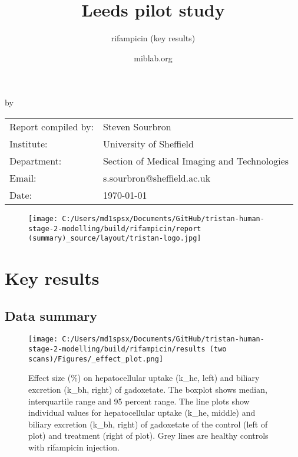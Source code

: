 \documentclass{epflreport}%
\begin{document}
%
\normalsize%
\frontmatter%
\title{Leeds pilot study}%
\subtitle{rifampicin (key results)}%
\author{miblab.org}%
\subject{D2.13 {-} Internal report}%
%
%
%
\makecover%
\begin{titlepage}%
\begin{center}%
\makeatletter%
\largetitlestyle\fontsize{45}{45}\selectfont\@title%
\makeatother%
\linebreak%
\makeatletter%
\ifdefvoid{\@subtitle}{}{\bigskip\titlestyle\fontsize{20}{20}\selectfont\@subtitle}%
\makeatother%
\linebreak%
\bigskip%
\bigskip%
by%
\linebreak%
\bigskip%
\bigskip%
\makeatletter%
\largetitlestyle\fontsize{25}{25}\selectfont\@author%
\makeatother%
\vfill%
\large%
\begin{tabular}{ll}%
\hline%
Report compiled by: &Steven Sourbron\\%
Institute: &University of Sheffield\\%
Department: &Section of Medical Imaging and Technologies\\%
Email: &s.sourbron@sheffield.ac.uk\\%
Date: &\today\\%
\hline%
\end{tabular}%


\begin{figure}[b!]%
\centering%
\centering%
\texttt{[image: C:/Users/md1spsx/Documents/GitHub/tristan-human-stage-2-modelling/build/rifampicin/report (summary)\_source/layout/tristan-logo.jpg]}%
\end{figure}

%
\end{center}%
\end{titlepage}%
\newpage%
\tableofcontents%
\mainmatter%
\clearpage%
\chapter{Key results}%
\section{Data summary}%
\label{sec:Datasummary}%

%


\begin{figure}[h!]%
\centering%
\texttt{[image: C:/Users/md1spsx/Documents/GitHub/tristan-human-stage-2-modelling/build/rifampicin/results (two scans)/Figures/\_effect\_plot.png]}%
\caption{Effect size (\%) on hepatocellular uptake (k\_he, left) and biliary excretion (k\_bh, right) of gadoxetate. The boxplot shows median, interquartile range and 95 percent range. The line plots show individual values for hepatocellular uptake (k\_he, middle) and biliary excretion (k\_bh, right) of gadoxetate of the control (left of plot) and treatment (right of plot). Grey lines are healthy controls with rifampicin injection.}%
\end{figure}
\end{document}
